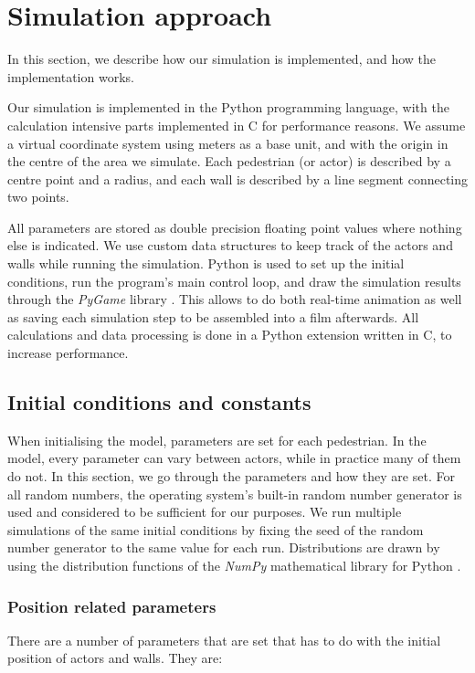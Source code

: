 \section{Simulation approach}
\label{sec:simulation}
In this section, we describe how our simulation is implemented, and how the 
implementation works.

Our simulation is implemented in the Python programming language, with the 
calculation intensive parts implemented in C for performance reasons. We 
assume a virtual coordinate system using meters as a base unit, and with the 
origin in the centre of the area we simulate. Each pedestrian (or actor) is 
described by a centre point and a radius, and each wall is described by a line 
segment connecting two points.

All parameters are stored as double precision floating point values where 
nothing else is indicated. We use custom data structures to keep track of the 
actors and walls while running the simulation. Python is used to set up the 
initial conditions, run the program's main control loop, and draw the 
simulation results through the \emph{PyGame} library \cite{pygame}. This 
allows to do both real-time animation as well as saving each simulation step 
to be assembled into a film afterwards. All calculations and data processing 
is done in a Python extension written in C, to increase performance.

\subsection{Initial conditions and constants}
When initialising the model, parameters are set for each pedestrian. In the 
model, every parameter can vary between actors, while in practice many of them 
do not. In this section, we go through the parameters and how they are set.  
For all random numbers, the operating system's built-in random number 
generator is used and considered to be sufficient for our purposes. We run 
multiple simulations of the same initial conditions by fixing the seed of the 
random number generator to the same value for each run. Distributions are 
drawn by using the distribution functions of the \emph{NumPy} mathematical 
library for Python \cite{numpy}.

\subsubsection{Position related parameters}
There are a number of parameters that are set that has to do with the initial 
position of actors and walls. They are:

